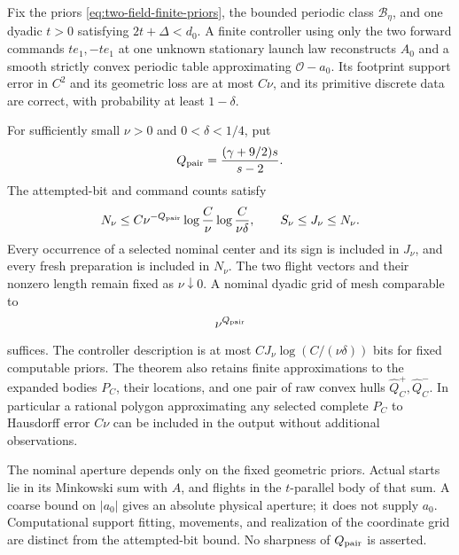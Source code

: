 \begin{theorem}
\label{thm:two-field-finite-geometry}
Fix the priors \eqref{eq:two-field-finite-priors}, the bounded periodic
class $\mathcal B_\eta$, and one dyadic $t>0$ satisfying
$2t+\Delta<d_0$.  A finite controller using only the two forward
commands $te_1,-te_1$ at one unknown stationary launch law reconstructs
$A_0$ and a smooth strictly convex periodic table approximating
$\mathcal O-a_0$.  Its footprint support error in $C^2$ and its
geometric loss are at most $C\nu$, and its primitive discrete data
are correct, with probability at least $1-\delta$.

For sufficiently small $\nu>0$ and $0<\delta<1/4$, put
\begin{equation}\label{eq:two-field-finite-exponent}
                    Q_{\rm pair}=\frac{(\gamma+9/2)s}{s-2}.
\end{equation}
The attempted-bit and command counts satisfy
\begin{equation}\label{eq:two-field-finite-cost}
 N_\nu\le C\nu^{-Q_{\rm pair}}
              \log\frac C\nu\log\frac C{\nu\delta},
                     \qquad S_\nu\le J_\nu\le N_\nu.
\end{equation}
Every occurrence of a selected nominal center and its sign is included
in $J_\nu$, and every fresh preparation is included in $N_\nu$.
The two flight vectors and their nonzero length remain fixed as
$\nu\downarrow0$.  A nominal dyadic grid of mesh comparable to
\begin{equation}\label{eq:two-field-finite-mesh}
                         \nu^{Q_{\rm pair}}
\end{equation}
suffices.  The controller description is at most
$CJ_\nu\log(C/(\nu\delta))$ bits for fixed computable priors.
The theorem also retains finite approximations to the expanded bodies
$P_C$, their locations, and one pair of raw convex hulls
$\widehat Q_C^+,\widehat Q_C^-$.  In particular a rational polygon
approximating any selected complete $P_C$ to Hausdorff error $C\nu$
can be included in the output without additional observations.

The nominal aperture depends only on the fixed geometric priors.
Actual starts lie in its Minkowski sum with $A$, and flights in the
$t$-parallel body of that sum.  A coarse bound on $|a_0|$ gives an
absolute physical aperture; it does not supply $a_0$.  Computational
support fitting, movements, and realization of the coordinate grid
are distinct from the attempted-bit bound.  No sharpness of
$Q_{\rm pair}$ is asserted.
\end{theorem}
